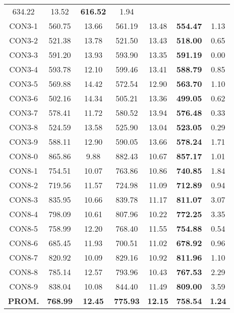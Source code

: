 \begin{table}[ht]
\begin{tabular}{c c c c c c c}
634.22 & 13.52 & \bf{616.52} & 
1.94\\CON3-1 & 560.75 & 13.66 & 
561.19 & 13.48 & \bf{554.47} & 
1.13\\CON3-2 & 521.38 & 13.78 & 
521.50 & 13.43 & \bf{518.00} & 
0.65\\CON3-3 & 591.20 & 13.93 & 
593.90 & 13.35 & \bf{591.19} & 
0.00\\CON3-4 & 593.78 & 12.10 & 
599.46 & 13.41 & \bf{588.79} & 
0.85\\CON3-5 & 569.88 & 14.42 & 
572.54 & 12.90 & \bf{563.70} & 
1.10\\CON3-6 & 502.16 & 14.34 & 
505.21 & 13.36 & \bf{499.05} & 
0.62\\CON3-7 & 578.41 & 11.72 & 
580.52 & 13.94 & \bf{576.48} & 
0.33\\CON3-8 & 524.59 & 13.58 & 
525.90 & 13.04 & \bf{523.05} & 
0.29\\CON3-9 & 588.11 & 12.90 & 
590.05 & 13.66 & \bf{578.24} & 
1.71\\CON8-0 & 865.86 & 9.88 & 
882.43 & 10.67 & \bf{857.17} & 
1.01\\CON8-1 & 754.51 & 10.07 & 
763.86 & 10.86 & \bf{740.85} & 
1.84\\CON8-2 & 719.56 & 11.57 & 
724.98 & 11.09 & \bf{712.89} & 
0.94\\CON8-3 & 835.95 & 10.66 & 
839.78 & 11.17 & \bf{811.07} & 
3.07\\CON8-4 & 798.09 & 10.61 & 
807.96 & 10.22 & \bf{772.25} & 
3.35\\CON8-5 & 758.99 & 12.20 & 
768.40 & 11.55 & \bf{754.88} & 
0.54\\CON8-6 & 685.45 & 11.93 & 
700.51 & 11.02 & \bf{678.92} & 
0.96\\CON8-7 & 820.92 & 10.09 & 
829.16 & 10.92 & \bf{811.96} & 
1.10\\CON8-8 & 785.14 & 12.57 & 
793.96 & 10.43 & \bf{767.53} & 
2.29\\CON8-9 & 838.04 & 10.08 & 
844.40 & 11.49 & \bf{809.00} & 
3.59\\\bf{PROM.} & 
\bf{768.99} & \bf{12.45} & \bf{775.93} & \bf{12.15} & \bf{758.54} & \bf{1.24}\\[1ex]\hline
\end{tabular}
\label{table:nonlin}
\end{table} \clearpage
